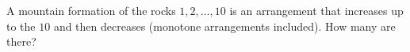 A mountain formation of the rocks $1,2,\dots,10$ is an arrangement that increases up to the $10$ and then decreases (monotone arrangements included). How many are there?
